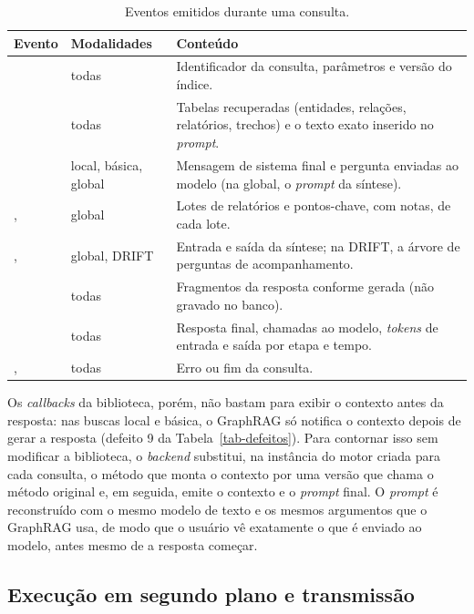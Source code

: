 \begin{table}[htb]
\centering
\caption{Eventos emitidos durante uma consulta.}
\label{tab-eventos}
\footnotesize
\begin{tabular}{L{3.2cm} L{2.6cm} L{8.4cm}}
\toprule
\textbf{Evento} & \textbf{Modalidades} & \textbf{Conteúdo} \\
\midrule
{} & todas & Identificador da consulta, parâmetros e versão do índice. \\
 & todas & Tabelas recuperadas (entidades, relações, relatórios, trechos) e o texto exato inserido no \textit{prompt}. \\
 & local, básica, global & Mensagem de sistema final e pergunta enviadas ao modelo (na global, o \textit{prompt} da síntese). \\
,  & global & Lotes de relatórios e pontos-chave, com notas, de cada lote. \\
,  & global, DRIFT & Entrada e saída da síntese; na DRIFT, a árvore de perguntas de acompanhamento. \\
 & todas & Fragmentos da resposta conforme gerada (não gravado no banco). \\
 & todas & Resposta final, chamadas ao modelo, \textit{tokens} de entrada e saída por etapa e tempo. \\
,  & todas & Erro ou fim da consulta. \\
\bottomrule
\end{tabular}
\end{table}

Os \textit{callbacks} da biblioteca, porém, não bastam para exibir o contexto antes da resposta: nas buscas local e básica, o GraphRAG só notifica o contexto depois de gerar a resposta (defeito 9 da Tabela~\ref{tab-defeitos}). Para contornar isso sem modificar a biblioteca, o \textit{backend} substitui, na instância do motor criada para cada consulta, o método que monta o contexto por uma versão que chama o método original e, em seguida, emite o contexto e o \textit{prompt} final. O \textit{prompt} é reconstruído com o mesmo modelo de texto e os mesmos argumentos que o GraphRAG usa, de modo que o usuário vê exatamente o que é enviado ao modelo, antes mesmo de a resposta começar.

\subsection{Execução em segundo plano e transmissão}
\label{sec-aplicacao-backend-sse}

